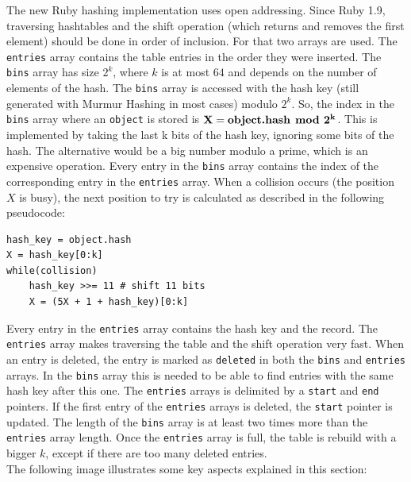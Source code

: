\documentclass[oneside, 12pt]{article}
\theoremstyle{break}
\begin{document}
The new Ruby hashing implementation uses open addressing.
Since Ruby 1.9, traversing hashtables and the shift operation (which returns and removes the first element) should be done in order of inclusion.
For that two arrays are used.
The \lstinline{entries} array contains the table entries in the order they were inserted.
The \lstinline{bins} array has size $2^k$, where $k$ is at most $64$ and depends on the number of elements of the hash.
The \lstinline{bins} array is accessed with the hash key (still generated with Murmur Hashing in most cases) modulo $2^k$.
So, the index in the \lstinline{bins} array where an \lstinline{object} is stored is $\mathbf{X = \text{\textbf{object.hash}}\!\!\boldsymbol{\mod} 2^k}$.
This is implemented by taking the last k bits of the hash key, ignoring some bits of the hash.
The alternative would be a big number modulo a prime, which is an expensive operation.
Every entry in the \lstinline{bins} array contains the index of the corresponding entry in the \lstinline{entries} array.
When a collision occurs (the position $X$ is busy), the next position to try is calculated as described in the following pseudocode:
\begin{lstlisting}
hash_key = object.hash
X = hash_key[0:k]
while(collision)
    hash_key >>= 11 # shift 11 bits
    X = (5X + 1 + hash_key)[0:k]
\end{lstlisting}

Every entry in the \lstinline{entries} array contains the hash key and the record.
The \lstinline{entries} array makes traversing the table and the shift operation very fast.
When an entry is deleted, the entry is marked as \lstinline{deleted} in both the \lstinline{bins} and \lstinline{entries} arrays.
In the \lstinline{bins} array this is needed to be able to find entries with the same hash key after this one.
The \lstinline{entries} arrays is delimited by a \lstinline{start} and \lstinline{end} pointers.
If the first entry of the \lstinline{entries} arrays is deleted, the \lstinline{start} pointer is updated.
The length of the \lstinline{bins} array is at least two times more than the \lstinline{entries} array length.
Once the \lstinline{entries} array is full, the table is rebuild with a bigger $k$, except if there are too many deleted entries.\\

The following image illustrates some key aspects explained in this section:\\
\end{document}

